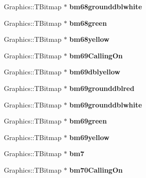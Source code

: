 \begin{DoxyCompactItemize}
Graphics\+::\+T\+Bitmap $\ast$ {\bfseries bm68grounddblwhite}
\item 
\mbox{\label{class_t_rail_graphics_af757f0fb17fcb22d008b75b9b47d5a07}} 
Graphics\+::\+T\+Bitmap $\ast$ {\bfseries bm68green}
\item 
\mbox{\label{class_t_rail_graphics_ab29cefbaf9e37f9310b66aade818b61e}} 
Graphics\+::\+T\+Bitmap $\ast$ {\bfseries bm68yellow}
\item 
\mbox{\label{class_t_rail_graphics_a7a8e97317c7f206137ffbb9966402d59}} 
Graphics\+::\+T\+Bitmap $\ast$ {\bfseries bm69\+Calling\+On}
\item 
\mbox{\label{class_t_rail_graphics_a0e8ea4f17dfafb2a63c13079d6f41125}} 
Graphics\+::\+T\+Bitmap $\ast$ {\bfseries bm69dblyellow}
\item 
\mbox{\label{class_t_rail_graphics_a00e746faaf01affcf5c48b4a175595c1}} 
Graphics\+::\+T\+Bitmap $\ast$ {\bfseries bm69grounddblred}
\item 
\mbox{\label{class_t_rail_graphics_ae42f70241165e070cc0c5c1f25e79f62}} 
Graphics\+::\+T\+Bitmap $\ast$ {\bfseries bm69grounddblwhite}
\item 
\mbox{\label{class_t_rail_graphics_a741dfc55e5393fee99e8081439f0924e}} 
Graphics\+::\+T\+Bitmap $\ast$ {\bfseries bm69green}
\item 
\mbox{\label{class_t_rail_graphics_a9c14b504cc4dd019ba2584e1f907342a}} 
Graphics\+::\+T\+Bitmap $\ast$ {\bfseries bm69yellow}
\item 
\mbox{\label{class_t_rail_graphics_a04d292b5e22e78d59d5cd9e9888f4a82}} 
Graphics\+::\+T\+Bitmap $\ast$ {\bfseries bm7}
\item 
\mbox{\label{class_t_rail_graphics_a31e8e4756f64d4a1081901119c5a731e}} 
Graphics\+::\+T\+Bitmap $\ast$ {\bfseries bm70\+Calling\+On}
\item 
\mbox{\label{class_t_rail_graphics_aae0fd5ca244c65c3be4567c00485b76e}} 

\end{DoxyCompactItemize}
